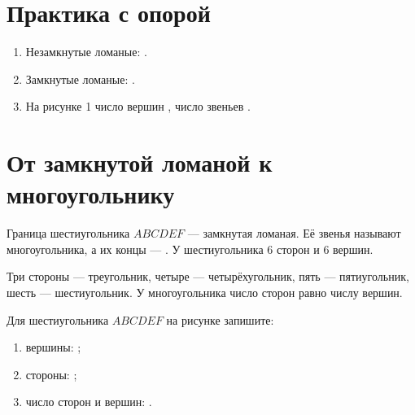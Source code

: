 \section{Практика с опорой}

\studentrecognizefigure

\begin{practicebox}
  \begin{enumerate}[label=\alph*)]
    \item Незамкнутые ломаные: \answerblank[30mm].
    \item Замкнутые ломаные: \answerblank[30mm].
    \item На рисунке 1 число вершин \answerblank[12mm], число звеньев
      \answerblank[12mm].
  \end{enumerate}
\end{practicebox}

\section{От замкнутой ломаной к многоугольнику}

\polygonpartsfigure

\begin{fillbox}
  Граница шестиугольника $ABCDEF$ --- замкнутая ломаная.
  Её звенья называют \answerblank[25mm] многоугольника, а их концы ---
  \answerblank[25mm]. У шестиугольника $6$ сторон и $6$ вершин.
\end{fillbox}

\polygonnamesfigure

\begin{notebox}
  Три стороны --- треугольник, четыре --- четырёхугольник, пять ---
  пятиугольник, шесть --- шестиугольник. У многоугольника число сторон
  равно числу вершин.
\end{notebox}

\begin{practicebox}
  Для шестиугольника $ABCDEF$ на рисунке запишите:
  \begin{enumerate}[label=\alph*)]
    \item вершины: \answerblank[95mm];
    \item стороны: \answerblank[95mm];
    \item число сторон и вершин: \answerblank[50mm].
  \end{enumerate}
\end{practicebox}

